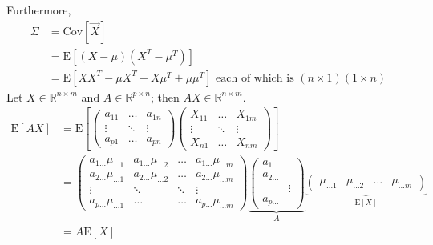 \documentclass[12pt]{article}
\newcommand{\expected}[1]{\mathrm{E}[#1]}
\newcommand{\covariance}[1]{\mathrm{Cov}[#1]}
\begin{document}
Furthermore, $$ \begin{aligned} \Sigma &= \covariance{\vec{X}} \\ &= \expected{(X - \mu)(X^T - \mu^T)} \\ &= \expected{XX^T - \mu X^T - X\mu^T + \mu \mu^T} \text{ each of which is } (n \times 1)(1 \times n) \end{aligned} $$ 
Let $X \in \mathbb{R}^{n \times m}$ and $A \in \mathbb{R}^{p \times n}$; then $AX \in \mathbb{R}^{n \times m}$. 
$$ \begin{aligned} \expected{AX} &= \expected{ \begin{pmatrix} a_{11} & \dots & a_{1n} \\ \vdots & \ddots & \vdots \\ a_{p1} & \dots & a_{pn} \end{pmatrix} \begin{pmatrix} X_{11} & \dots & X_{1m} \\ \vdots & \ddots & \vdots \\ X_{n1} & \dots & X_{nm} \end{pmatrix}} 
\\ &= \begin{pmatrix} a_{1\dots} \mu_{\dots1} & a_{1\dots}\mu_{\dots2} & \dots & a_{1\dots}\mu_{\dots m} \\ a_{2\dots}\mu_{\dots1} & a_{2\dots}\mu_{\dots2} & \dots & a_{2\dots}\mu_{\dots m} \\ \vdots & \ddots & \ddots & \vdots \\ a_{p\dots}\mu_{\dots1} & \dots & \dots & a_{p\dots}\mu_{\dots m} \end{pmatrix} \underbrace{\begin{pmatrix} a_{1\dots} \\ a_{2\dots} \\ &\vdots \\ a_{p\dots} \end{pmatrix}}_{A} \underbrace{\begin{pmatrix} \mu_{\dots 1} & \mu_{\dots 2} & \dots & \mu_{\dots m} \end{pmatrix}}_{\expected{X}} 
\\ &= A\expected{X} \end{aligned} $$ 
\end{document}
